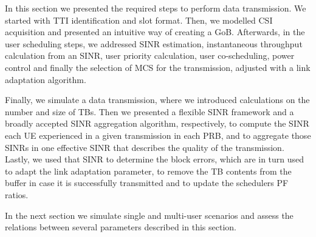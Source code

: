 In this section we presented the required steps to perform data transmission. We started with TTI identification and slot format. Then, we modelled CSI acquisition and presented an intuitive way of creating a \ac{GoB}. Afterwards, in the user scheduling steps, we addressed SINR estimation, instantaneous throughput calculation from an SINR, user priority calculation, user co-scheduling, power control and finally the selection of MCS for the transmission, adjusted with a link adaptation algorithm.

Finally, we simulate a data transmission, where we introduced calculations on the number and size of TBs. Then we presented a flexible SINR framework and a broadly accepted SINR aggregation algorithm, respectively, to compute the SINR each UE experienced in a given transmission in each PRB, and to aggregate those SINRs in one effective SINR that describes the quality of the transmission. Lastly, we used that SINR to determine the block errors, which are in turn used to adapt the link adaptation parameter, to remove the TB contents from the buffer in case it is successfully transmitted and to update the schedulers PF ratios.

In the next section we simulate single and multi-user scenarios and assess the relations between several parameters described in this section. 

